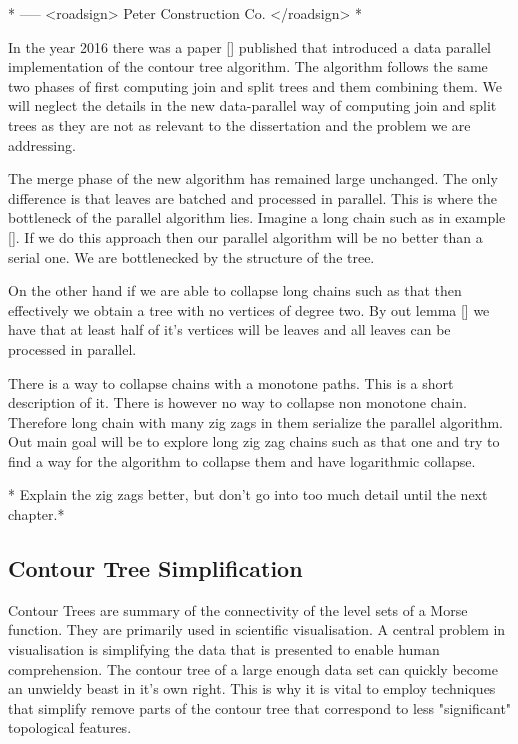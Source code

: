 * ----- <roadsign> Peter Construction Co. </roadsign> *


In the year 2016 there was a paper [] published that introduced a data parallel implementation of the contour tree algorithm. The algorithm follows the same two phases of first computing join and split trees and them combining them. We will neglect the details in the new data-parallel way of computing join and split trees as they are not as relevant to the dissertation and the problem we are addressing.  


The merge phase of the new algorithm has remained large unchanged. The only difference is that leaves are batched and processed in parallel. This is where the bottleneck of the parallel algorithm lies. Imagine a long chain such as in example []. If we do this approach then our parallel algorithm will be no better than a serial one. We are bottlenecked by the structure of the tree. 

On the other hand if we are able to collapse long chains such as that then effectively we obtain a tree with no vertices of degree two. By out lemma [] we have that at least half of it's vertices will be leaves and all leaves can be processed in parallel.

There is a way to collapse chains with a monotone paths. This is a short description of it. There is however no way to collapse non monotone chain. Therefore long chain with many zig zags in them serialize the parallel algorithm. Out main goal will be to explore long zig zag chains such as that one and try to find a way for the algorithm to collapse them and have logarithmic collapse.

* Explain the zig zags better, but don't go into too much detail until the next chapter.*

\subsection{Contour Tree Simplification}

Contour Trees are summary of the connectivity of the level sets of a Morse function. They are primarily used in scientific visualisation. A central problem in visualisation is simplifying the data that is presented to enable human comprehension. The contour tree of a large enough data set can quickly become an unwieldy beast in it's own right. This is why it is vital to employ techniques that simplify remove parts of the contour tree that correspond to less "significant" topological features.

